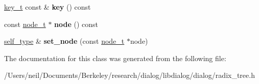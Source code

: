 \begin{DoxyCompactItemize}
\item 
\mbox{\label{classdialog_1_1index_1_1rt__reflog__it_abd127469a4d5af8c4d99bee98d08e0ae}} 
\hyperlink{classdialog_1_1byte__string}{key\+\_\+t} const  \& {\bfseries key} () const
\item 
\mbox{\label{classdialog_1_1index_1_1rt__reflog__it_a0e00e7d3b1ff09355a7359dc6ec52605}} 
const \hyperlink{structdialog_1_1index_1_1radix__tree__node}{node\+\_\+t} $\ast$ {\bfseries node} () const
\item 
\mbox{\label{classdialog_1_1index_1_1rt__reflog__it_a70328e3413f39eb1182f8cfdf7067a52}} 
\hyperlink{classdialog_1_1index_1_1rt__reflog__it}{self\+\_\+type} \& {\bfseries set\+\_\+node} (const \hyperlink{structdialog_1_1index_1_1radix__tree__node}{node\+\_\+t} $\ast$node)
\end{DoxyCompactItemize}


The documentation for this class was generated from the following file\+:\begin{DoxyCompactItemize}
\item 
/\+Users/neil/\+Documents/\+Berkeley/research/dialog/libdialog/dialog/radix\+\_\+tree.\+h\end{DoxyCompactItemize}
